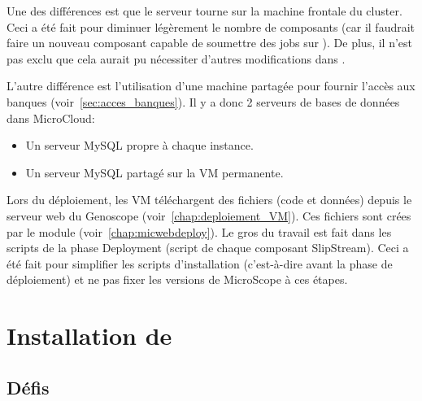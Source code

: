 Une des différences est que le serveur  tourne
sur la machine frontale du cluster.
Ceci a été fait pour diminuer légèrement le nombre de composants
(car il faudrait faire un nouveau composant capable de soumettre des jobs sur ).
De plus, il n'est pas exclu que cela aurait pu nécessiter d'autres modifications dans .

L'autre différence est l'utilisation d'une machine partagée pour fournir l'accès aux banques (voir~\autoref{sec:acces_banques}).
Il y a donc 2 serveurs de bases de données dans MicroCloud:
\begin{itemize}
    \item Un serveur MySQL propre à chaque instance.
    \item Un serveur MySQL partagé sur la VM permanente.
\end{itemize}\vspace*{\baselineskip}

Lors du déploiement, les VM téléchargent des fichiers (code et données) depuis le serveur web du Genoscope (voir~\autoref{chap:deploiement_VM}).
Ces fichiers sont crées par le module \micWEBdeployVer{} (voir~\autoref{chap:micwebdeploy}).
Le gros du travail est fait dans les scripts de la phase Deployment (script  de chaque composant SlipStream).
Ceci a été fait pour simplifier les scripts d'installation (c'est-à-dire avant la phase de déploiement)
et ne pas fixer les versions de MicroScope à ces étapes.

\section{Installation de } \label{sec:installation_jbpmmicroscope}

\subsection{Défis}

